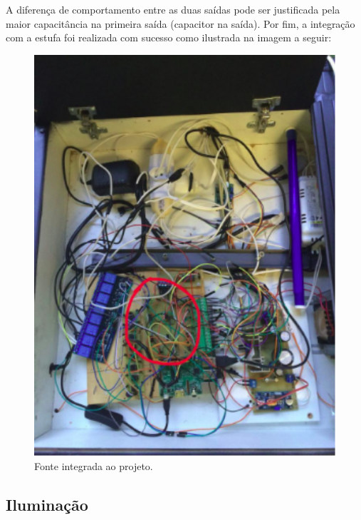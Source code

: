 A diferença de comportamento entre as duas saídas pode ser justificada pela maior capacitância na primeira saída (capacitor na saída).
Por fim, a integração com a estufa foi realizada com sucesso como ilustrada na imagem a seguir:

\begin{figure}[!htb]
	\centering
	\includegraphics[width=14cm]{figuras/ponteHintegrada.png}
	\caption{ Fonte integrada ao projeto.}
	\label{ponteHintegrada}
\end{figure}

\subsection{Iluminação}

